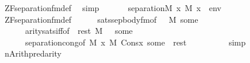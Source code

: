 \begin{isabellebody}
\ ZF{\isacharunderscore}{\kern0pt}separation{\isacharunderscore}{\kern0pt}fm{\isacharunderscore}{\kern0pt}def\ \isamarkupfalse%
\ simp\isanewline
\ \ \isamarkupfalse%
\isanewline
\ \ \isamarkupfalse%
\ {\isachardoublequoteopen}separation{\isacharparenleft}{\kern0pt}{\isacharhash}{\kern0pt}{\isacharhash}{\kern0pt}M{\isacharcomma}{\kern0pt}\ {\isasymlambda}x{\isachardot}{\kern0pt}\ M{\isacharcomma}{\kern0pt}\ {\isacharbrackleft}{\kern0pt}x{\isacharbrackright}{\kern0pt}\ {\isacharat}{\kern0pt}\ env\ {\isasymTurnstile}\ {\isasymphi}{\isacharparenright}{\kern0pt}{\isachardoublequoteclose}\isanewline
\ \ \ \ \isamarkupfalse%
\ ZF{\isacharunderscore}{\kern0pt}separation{\isacharunderscore}{\kern0pt}fm{\isacharunderscore}{\kern0pt}def\isanewline
\ \ \ \ \isamarkupfalse%
\ sats{\isacharunderscore}{\kern0pt}sep{\isacharunderscore}{\kern0pt}body{\isacharunderscore}{\kern0pt}fm{\isacharbrackleft}{\kern0pt}of\ {\isasymphi}\ {\isachardoublequoteopen}{\isacharbrackleft}{\kern0pt}{\isacharbrackright}{\kern0pt}{\isachardoublequoteclose}\ M\ some{\isacharbrackright}{\kern0pt}\isanewline
\ \ \ \ \ \ arity{\isacharunderscore}{\kern0pt}sats{\isacharunderscore}{\kern0pt}iff{\isacharbrackleft}{\kern0pt}of\ {\isasymphi}\ rest\ M\ {\isachardoublequoteopen}{\isacharbrackleft}{\kern0pt}{\isacharunderscore}{\kern0pt}{\isacharbrackright}{\kern0pt}\ {\isacharat}{\kern0pt}\ some{\isachardoublequoteclose}{\isacharbrackright}{\kern0pt}\isanewline
\ \ \ \ \ \ separation{\isacharunderscore}{\kern0pt}cong{\isacharbrackleft}{\kern0pt}of\ {\isachardoublequoteopen}{\isacharhash}{\kern0pt}{\isacharhash}{\kern0pt}M{\isachardoublequoteclose}\ {\isachardoublequoteopen}{\isasymlambda}x{\isachardot}{\kern0pt}\ M{\isacharcomma}{\kern0pt}\ Cons{\isacharparenleft}{\kern0pt}x{\isacharcomma}{\kern0pt}\ some\ {\isacharat}{\kern0pt}\ rest{\isacharparenright}{\kern0pt}\ {\isasymTurnstile}\ {\isasymphi}{\isachardoublequoteclose}\ {\isacharunderscore}{\kern0pt}\ {\isacharbrackright}{\kern0pt}\isanewline
\ \ \ \ \isamarkupfalse%
\ simp\isanewline
{}\isamarkupfalse%
\ %
\isanewline
\ \ \isamarkupfalse%
\ {\isacharquery}{\kern0pt}n{\isacharequal}{\kern0pt}{\isachardoublequoteopen}Arith{\isachardot}{\kern0pt}pred{\isacharparenleft}{\kern0pt}arity{\isacharparenleft}{\kern0pt}{\isasymphi}{\isacharparenright}{\kern0pt}{\isacharparenright}{\kern0pt}{\isachardoublequoteclose}\isanewline
\ \ \isamarkupfalse%

\end{isabellebody}
